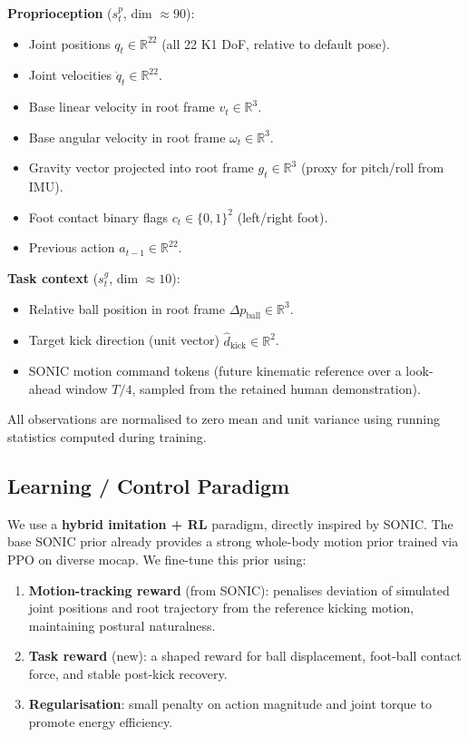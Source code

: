 \documentclass[12pt]{article}
\begin{document}
\noindent\textbf{Proprioception} ($s^p_t$, dim $\approx 90$):
\begin{itemize}[noitemsep]
    \item Joint positions $q_t \in \mathbb{R}^{22}$ (all 22 K1 DoF, relative to default pose).
    \item Joint velocities $\dot{q}_t \in \mathbb{R}^{22}$.
    \item Base linear velocity in root frame $v_t \in \mathbb{R}^3$.
    \item Base angular velocity in root frame $\omega_t \in \mathbb{R}^3$.
    \item Gravity vector projected into root frame $g_t \in \mathbb{R}^3$ (proxy for pitch/roll from IMU).
    \item Foot contact binary flags $c_t \in \{0,1\}^2$ (left/right foot).
    \item Previous action $a_{t-1} \in \mathbb{R}^{22}$.
\end{itemize}

\noindent\textbf{Task context} ($s^g_t$, dim $\approx 10$):
\begin{itemize}[noitemsep]
    \item Relative ball position in root frame $\Delta p_\text{ball} \in \mathbb{R}^3$.
    \item Target kick direction (unit vector) $\hat{d}_\text{kick} \in \mathbb{R}^2$.
    \item SONIC motion command tokens (future kinematic reference over a look-ahead window $T/4$, sampled from the retained human demonstration).
\end{itemize}

\noindent All observations are normalised to zero mean and unit variance using running statistics computed during training.

\subsection{Learning / Control Paradigm}
We use a \textbf{hybrid imitation + RL} paradigm, directly inspired by SONIC. The base SONIC prior already provides a strong whole-body motion prior trained via PPO on diverse mocap. We fine-tune this prior using:

\begin{enumerate}[noitemsep]
    \item \textbf{Motion-tracking reward} (from SONIC): penalises deviation of simulated joint positions and root trajectory from the reference kicking motion, maintaining postural naturalness.
    \item \textbf{Task reward} (new): a shaped reward for ball displacement, foot-ball contact force, and stable post-kick recovery.
    \item \textbf{Regularisation}: small penalty on action magnitude and joint torque to promote energy efficiency.
\end{enumerate}
\end{document}
